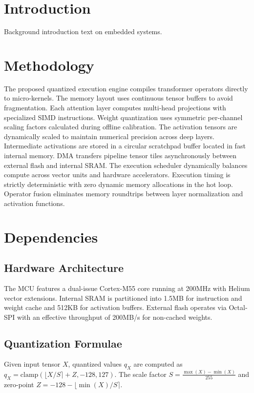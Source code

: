 \documentclass{article}
\begin{document}
\section{Introduction}
\label{sec:intro}
Background introduction text on embedded systems.

\section{Methodology}
\label{sec:methodology}
The proposed quantized execution engine compiles transformer operators directly to micro-kernels.
The memory layout uses continuous tensor buffers to avoid fragmentation.
Each attention layer computes multi-head projections with specialized SIMD instructions.
Weight quantization uses symmetric per-channel scaling factors calculated during offline calibration.
The activation tensors are dynamically scaled to maintain numerical precision across deep layers.
Intermediate activations are stored in a circular scratchpad buffer located in fast internal memory.
DMA transfers pipeline tensor tiles asynchronously between external flash and internal SRAM.
The execution scheduler dynamically balances compute across vector units and hardware accelerators.
Execution timing is strictly deterministic with zero dynamic memory allocations in the hot loop.
Operator fusion eliminates memory roundtrips between layer normalization and activation functions.

\section{Dependencies}
\label{sec:dependencies}
\subsection{Hardware Architecture}
\label{subsec:hardware_arch}
The MCU features a dual-issue Cortex-M55 core running at 200MHz with Helium vector extensions.
Internal SRAM is partitioned into 1.5MB for instruction and weight cache and 512KB for activation buffers.
External flash operates via Octal-SPI with an effective throughput of 200MB/s for non-cached weights.

\subsection{Quantization Formulae}
\label{subsec:quant_formulae}
Given input tensor $X$, quantized values $q_X$ are computed as $q_X = \text{clamp}(\lfloor X / S \rceil + Z, -128, 127)$.
The scale factor $S = \frac{\max(X) - \min(X)}{255}$ and zero-point $Z = -128 - \lfloor \min(X) / S \rceil$.
\end{document}

